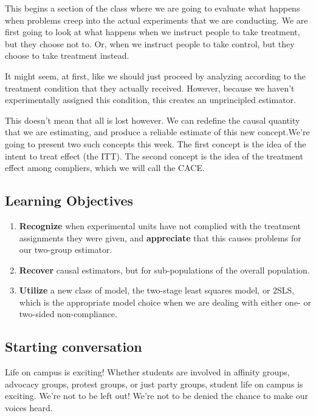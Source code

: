 \documentclass[
]{article}
\providecommand{\tightlist}{%
  \setlength{\itemsep}{0pt}\setlength{\parskip}{0pt}}
\theoremstyle{definition}
\theoremstyle{definition}
\theoremstyle{definition}
\theoremstyle{definition}
\theoremstyle{remark}
\begin{document}
This begins a section of the class where we are going to evaluate what happens when problems creep into the actual experiments that we are conducting. We are first going to look at what happens when we instruct people to take treatment, but they choose not to. Or, when we instruct people to take control, but they choose to take treatment instead.

It might seem, at first, like we should just proceed by analyzing according to the treatment condition that they actually received. However, because we haven't experimentally assigned this condition, this creates an unprincipled estimator.

This doesn't mean that all is lost however. We can redefine the causal quantity that we are estimating, and produce a reliable estimate of this new concept.We're going to present two such concepts this week. The first concept is the idea of the intent to treat effect (the ITT). The second concept is the idea of the treatment effect among compliers, which we will call the CACE.

\subsection{Learning Objectives}\label{learning-objectives-8}

\begin{enumerate}
\def\labelenumi{\arabic{enumi}.}
\tightlist
\item
  \textbf{Recognize} when experimental units have not complied with the treatment assignments they were given, and \textbf{appreciate} that this causes problems for our two-group estimator.
\item
  \textbf{Recover} causal estimators, but for sub-populations of the overall population.
\item
  \textbf{Utilize} a new class of model, the two-stage least squares model, or 2SLS, which is the appropriate model choice when we are dealing with either one- or two-sided non-compliance.
\end{enumerate}

\subsection{Starting conversation}\label{starting-conversation}

Life on campus is exciting! Whether students are involved in affinity groups, advocacy groups, protest groups, or just party groups, student life on campus is exciting. We're not to be left out! We're not to be denied the chance to make our voices heard.
\end{document}
